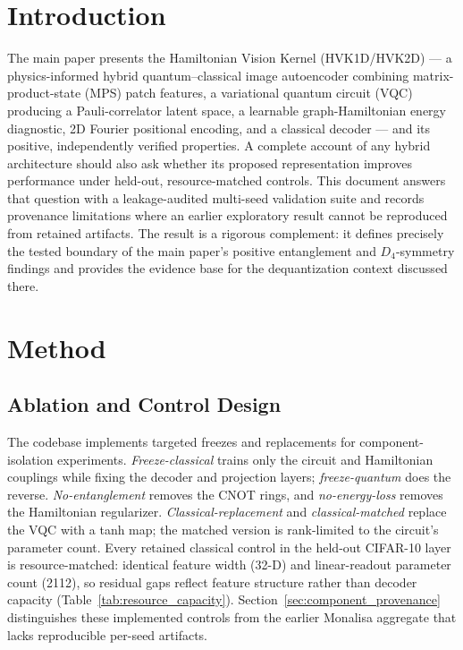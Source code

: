 \documentclass[11pt]{article}
\begin{document}
\section{Introduction}
The main paper presents the Hamiltonian Vision Kernel (HVK1D/HVK2D) --- a physics-informed hybrid quantum--classical image autoencoder combining matrix-product-state (MPS) patch features, a variational quantum circuit (VQC) producing a Pauli-correlator latent space, a learnable graph-Hamiltonian energy diagnostic, 2D Fourier positional encoding, and a classical decoder --- and its positive, independently verified properties. A complete account of any hybrid architecture should also ask whether its proposed representation improves performance under held-out, resource-matched controls. This document answers that question with a leakage-audited multi-seed validation suite and records provenance limitations where an earlier exploratory result cannot be reproduced from retained artifacts. The result is a rigorous complement: it defines precisely the tested boundary of the main paper's positive entanglement and $D_4$-symmetry findings and provides the evidence base for the dequantization context discussed there.

\section{Method}

\subsection{Ablation and Control Design}
The codebase implements targeted freezes and replacements for component-isolation experiments. \emph{Freeze-classical} trains only the circuit and Hamiltonian couplings while fixing the decoder and projection layers; \emph{freeze-quantum} does the reverse. \emph{No-entanglement} removes the CNOT rings, and \emph{no-energy-loss} removes the Hamiltonian regularizer. \emph{Classical-replacement} and \emph{classical-matched} replace the VQC with a tanh map; the matched version is rank-limited to the circuit's parameter count. Every retained classical control in the held-out CIFAR-10 layer is resource-matched: identical feature width (32-D) and linear-readout parameter count (2112), so residual gaps reflect feature structure rather than decoder capacity (Table~\ref{tab:resource_capacity}). Section~\ref{sec:component_provenance} distinguishes these implemented controls from the earlier Monalisa aggregate that lacks reproducible per-seed artifacts.
\end{document}
